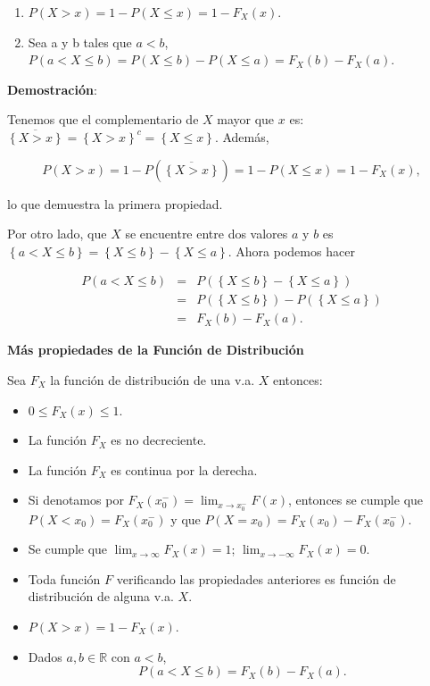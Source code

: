 \documentclass[]{book}
\providecommand{\tightlist}{%
  \setlength{\itemsep}{0pt}\setlength{\parskip}{0pt}}
\begin{document}
\begin{enumerate}
\def\labelenumi{\arabic{enumi}.}
\tightlist
\item
  \(P(X>x)=1-P(X\leq x)=1-F_{X}(x).\)
\item
  Sea a y b tales que \(a<b\), \(P(a<X\leq b)=P(X\leq b)-P(X\leq a)=F_{X}(b)-F_{X}(a).\)
\end{enumerate}

\textbf{Demostración}:

Tenemos que el complementario de \(X\) mayor que \(x\) es: \(\overline{\left\{X>x\right\}}=\left\{X>x\right\}^c=\left\{X\leq x\right\}\). Además,

\[P(X>x)=1-P(\overline{\left\{X>x\right\}})=1-P(X\leq x)=1-F_{X}(x),\]

lo que demuestra la primera propiedad.

Por otro lado, que \(X\) se encuentre entre dos valores \(a\) y \(b\) es \(\left\{a< X \leq b\right\}= \left\{X\leq b\right\}-\left\{X\leq a\right\}\). Ahora podemos hacer

\begin{eqnarray*}
P(a<X\leq b)&=&P(\left\{X\leq b\right\}-\left\{X\leq a\right\})\\
&=& P(\left\{X\leq b\right\})-P(\left\{X\leq a\right\})\\
&=& F_{X}(b)-F_{X}(a).
\end{eqnarray*}

 \textbf{Más propiedades de la Función de Distribución}

Sea \(F_{X}\) la función de distribución de una v.a. \(X\) entonces:

\begin{itemize}
\tightlist
\item
  \(0\leq F_{X}(x)\leq 1\).
\item
  La función \(F_{X}\) es no decreciente.
\item
  La función \(F_{X}\) es continua por la derecha.
\item
  Si denotamos por \(F_X(x_0^{-})=\displaystyle \lim_{x\to x_0^{-}} F(x)\),
  entonces se cumple que \(P(X< x_0)=F_X(x_0^{-})\) y que \(P(X=x_0)=F_X(x_0)-F_X(x_0^{-})\).
\item
  Se cumple que \(\displaystyle \lim_{x\to\infty} F_{X}(x)=1\); \(\displaystyle \lim_{x\to-\infty}F_{X}(x)=0\).
\item
  Toda función \(F\) verificando las propiedades anteriores es función de distribución de alguna v.a. \(X\).
\item
  \(P(X>x)=1-F_{X}(x)\).
\item
  Dados \(a,b\in \mathbb{R}\) con \(a<b\), \[P(a<X\leq b)=F_{X}(b)-F_{X}(a).\]
\end{itemize}
\end{document}

